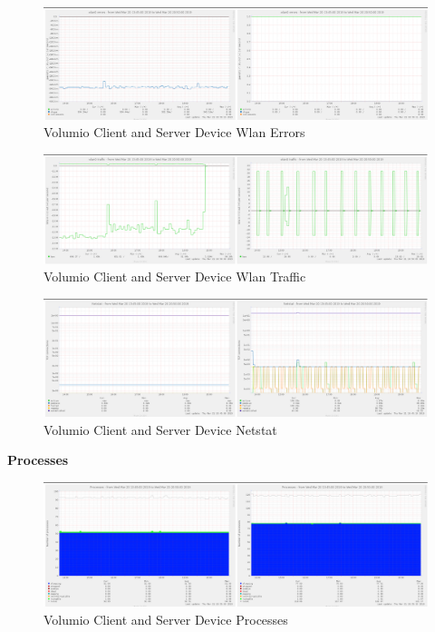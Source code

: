 \documentclass[11pt,a4paper,headinclude=false,footinclude=false]{scrreprt}
\begin{document}
\begin{figure}[H]
\includegraphics{ResultsAndAnalysis/VolumioServerTestImages/022VolumioWlan0Errors.png}
\centering
\caption{Volumio Client and Server Device Wlan Errors}
\label{VolumioWlanError}
\end{figure}

\begin{figure}[H]
\includegraphics{ResultsAndAnalysis/VolumioServerTestImages/023VolumioWlan0Traffic.png}
\centering
\caption{Volumio Client and Server Device Wlan Traffic}
\label{VolumioWlanTraffic}
\end{figure}

\begin{figure}[H]
\includegraphics{ResultsAndAnalysis/VolumioServerTestImages/018VolumioNetstat.png}
\centering
\caption{Volumio Client and Server Device Netstat}
\label{VolumioNetstat}
\end{figure}

\textbf{Processes}

\begin{figure}[H]
\includegraphics{ResultsAndAnalysis/VolumioServerTestImages/020VolumioProcesses.png}
\centering
\caption{Volumio Client and Server Device Processes}
\label{VolumioProcesses}
\end{figure}
\end{document}
